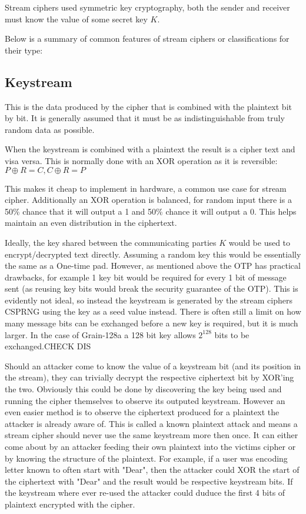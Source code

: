 \documentclass{report}
\let\Oldsubsection\subsection
\renewcommand{\subsection}{\FloatBarrier\Oldsubsection}
\begin{document}
Stream ciphers used symmetric key cryptography, both the sender and receiver must know the value of some secret key $K$.

Below is a summary of common features of stream ciphers or classifications for their type:

\subsection{Keystream}
This is the data produced by the cipher that is combined with the plaintext bit by bit. It is generally assumed that it must be as indistinguishable from truly random data as possible.

When the keystream is combined with a plaintext the result is a cipher text and visa versa. This is normally done with an XOR operation as it is reversible:
$P \oplus R=C, C \oplus R=P$

This makes it cheap to implement in hardware, a common use case for stream cipher. Additionally an XOR operation is balanced, for random input there is a 50\% chance that it will output a 1 and 50\% chance it will output a 0. This helps maintain an even distribution in the ciphertext.

Ideally, the key shared between the communicating parties $K$ would be used to encrypt/decrypted text directly. Assuming a random key this would be essentially the same as a One-time pad. However, as mentioned above the OTP has practical drawbacks, for example 1 key bit would be required for every 1 bit of message sent (as reusing key bits would break the security guarantee of the OTP\cite{}). This is evidently not ideal, so instead the keystream is generated by the stream ciphers CSPRNG using the key as a seed value instead. There is often still a limit on how many message bits can be exchanged before a new key is required, but it is much larger. In the case of Grain-128a a 128 bit key allows $2^128$ bits to be exchanged.CHECK DIS %

Should an attacker come to know the value of a keystream bit (and its position in the stream), they can trivially decrypt the respective ciphertext bit by XOR'ing the two. Obviously this could be done by discovering the key being used and running the cipher themselves to observe its outputed keystream. However an even easier method is to observe the ciphertext produced for a plaintext the attacker is already aware of. This is called a known plaintext attack and means a stream cipher should never use the same keystream more then once. It can either come about by an attacker feeding their own plaintext into the victims cipher or by knowing the structure of the plaintext. For example, if a user was encoding letter known to often start with "Dear", then the attacker could XOR the start of the ciphertext with "Dear" and the result would be respective keystream bits. If the keystream where ever re-used the attacker could duduce the first 4 bits of plaintext encrypted with the cipher.
\end{document}
